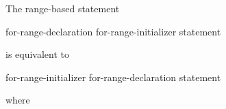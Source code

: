 \pnum
The range-based  statement
\begin{ncsimplebnf}
 \terminal{(}  for-range-declaration \terminal{:} for-range-initializer \terminal{)} statement
\end{ncsimplebnf}
is equivalent to
\begin{ncsimplebnf}
\terminal{\{}\br
\bnfindent {}\br
\bnfindent {} \terminal{\&\&} \terminal{=} for-range-initializer \terminal{;}\br
\bnfindent {}  \terminal{=}  \terminal{;}\br
\bnfindent {}  \terminal{=}  \terminal{;}\br
\bnfindent {} \terminal{(} \terminal{;}  \terminal{!=} \terminal{;} \terminal{++} \terminal{)} \terminal{\{}\br
\bnfindent\bnfindent for-range-declaration \terminal{=} \terminal{*}  \terminal{;}\br
\bnfindent\bnfindent statement\br
\bnfindent \terminal{\}}\br
\terminal{\}}
\end{ncsimplebnf}
where
